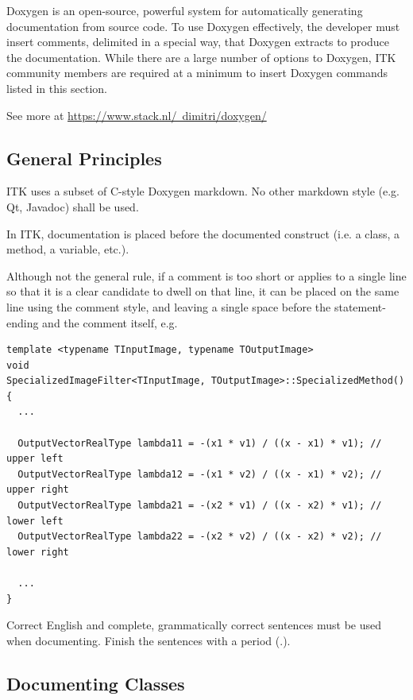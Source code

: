 Doxygen is an open-source, powerful system for automatically generating
documentation from source code. To use Doxygen effectively, the developer must
insert comments, delimited in a special way, that Doxygen extracts to produce
the documentation. While there are a large number of options to Doxygen,
ITK community members are required at a minimum to insert Doxygen commands
listed in this section.

See more at \href{https://www.stack.nl/~dimitri/doxygen/}
{https://www.stack.nl/~dimitri/doxygen/}


\subsection{General Principles}%
\label{subsec:GeneralPrinciples}

ITK uses a subset of C-style Doxygen markdown. No other markdown style (e.g. Qt,
Javadoc) shall be used.

In ITK, documentation is placed before the documented construct (i.e. a class, a
method, a variable, etc.).

Although not the general rule, if a comment is too short or applies to a single
line so that it is a clear candidate to dwell on that line, it can be placed on
the same line using the \code{//} comment style, and leaving a single space
before the statement-ending \code{;} and the comment itself, e.g.

\small
\begin{verbatim}
template <typename TInputImage, typename TOutputImage>
void
SpecializedImageFilter<TInputImage, TOutputImage>::SpecializedMethod()
{
  ...

  OutputVectorRealType lambda11 = -(x1 * v1) / ((x - x1) * v1); // upper left
  OutputVectorRealType lambda12 = -(x1 * v2) / ((x - x1) * v2); // upper right
  OutputVectorRealType lambda21 = -(x2 * v1) / ((x - x2) * v1); // lower left
  OutputVectorRealType lambda22 = -(x2 * v2) / ((x - x2) * v2); // lower right

  ...
}
\end{verbatim}
\normalsize

Correct English and complete, grammatically correct sentences must be used
when documenting. Finish the sentences with a period (.).


\subsection{Documenting Classes}%
\label{subsec:DocumentingClasses}

